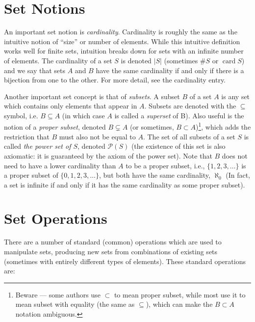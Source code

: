 \documentclass[12pt]{article}
\newcommand{\caP}{\mathcal{P}}
\DeclareMathOperator{\card}{card}
\begin{document}
\section{Set Notions}

An important set notion is \emph{cardinality}. Cardinality is roughly the same as the intuitive notion of ``size'' or number of elements. While this intuitive definition works well for finite sets, intuition breaks down for sets with an infinite number of elements. The cardinality of a set $S$ is denoted $|S|$ (sometimes $\# S$ or $\card S$) and we say that sets $A$ and $B$ have the same cardinality if and only if there is a bijection from one to the other. For more detail, see the cardinality entry.

Another important set concept is that of \emph{subsets}. A subset $B$ of a set $A$ is any set which contains only elements that appear in $A$. Subsets are denoted with the $\subseteq$ symbol, i.e. $B \subseteq A$ (in which case $A$ is called a \emph{superset} of B). Also useful is the notion of a \emph{proper subset}, denoted $B \subsetneq A$ (or sometimes, $B \subset A$)\footnote{Beware --- some authors use $\subset$ to mean proper subset, while most use it to mean subset with equality (the same as $\subseteq$), which can make the $B \subset A$ notation ambiguous.}, which adds the restriction that $B$ must also not be equal to $A$. The set of all subsets of a set $S$ is called \emph{the power set of $S$}, denoted $\caP(S)$ (the existence of this set is also axiomatic: it is guaranteed by the axiom of the power set). Note that $B$ does not need to have a lower cardinality than $A$ to be a proper subset, i.e., $\{1, 2, 3, \dotsc\}$ is a proper subset of $\{0, 1, 2, 3, \dotsc\}$, but both have the same cardinality, $\aleph_0$ (In fact, a set is infinite if and only if it has the same cardinality as some proper subset).

\section{Set Operations}

There are a number of standard (common) operations which are used to manipulate sets, producing new sets from combinations of existing sets (sometimes with entirely different types of elements). These standard operations are:
\end{document}
